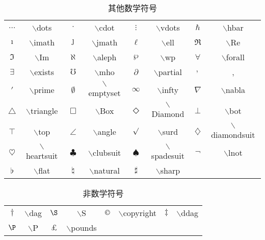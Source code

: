 \documentclass[UTF8]{ctexart}
\begin{document}
\begin{table}[H]
	\begin{center}
		\caption{其他数学符号}
		\begin{tabular}{cccccccc}
			
			
			$\dots$  &  $\backslash$dots  &  $\cdot$  & $\backslash$cdot  &  $\vdots$  & $\backslash$vdots  &  $\hbar$  &  $\backslash$hbar \\
			
			$\imath$ & $\backslash$imath &  $\jmath$  & $\backslash$jmath   &  $\ell$  & $\backslash$ell &  $\Re$ & $\backslash$Re \\
			
			
			$\Im$  &  $\backslash$Im  &  $\aleph$  & $\backslash$aleph  &  $\wp$  & $\backslash$wp  &  $\forall$  &  $\backslash$forall \\
			
			$\exists$ & $\backslash$exists &  $\mho$  & $\backslash$mho   &  $\partial$  & $\backslash$partial &  $,$ & , \\
			
			$\prime$ & $\backslash$prime &  $\emptyset$  & $\backslash$emptyset   &  $\infty$  & $\backslash$infty &  $\nabla$ & $\backslash$nabla \\	

			$\triangle$ & $\backslash$triangle &  $\Box$  & $\backslash$Box   &  $\Diamond$  & $\backslash$Diamond &  $\bot$ & $\backslash$bot \\	


			$\top$ & $\backslash$top &  $\angle$  & $\backslash$angle   &  $\surd$  & $\backslash$surd &  $\diamondsuit$ & $\backslash$diamondsuit \\	

			$\heartsuit$ & $\backslash$heartsuit &  $\clubsuit$  & $\backslash$clubsuit   &  $\spadesuit$  & $\backslash$spadesuit &  $\lnot$ & $\backslash$lnot \\	
			
			$\flat$ & $\backslash$flat &  $\natural$  & $\backslash$natural   &  $\sharp$  & $\backslash$sharp  \\				
		\end{tabular}
	\end{center}
\end{table}

\begin{table}[H]
	\begin{center}
		\caption{非数学符号}
		\begin{tabular}{cccccccc}
			
			
			$\dag$  &  $\backslash$dag  &  $\S$  & $\backslash$S  &  $\copyright$  & $\backslash$copyright  &  $\ddag$  &  $\backslash$ddag \\
			
			$\P$  &  $\backslash$P  &  $\pounds$  & $\backslash$pounds   \\
		\end{tabular}
	\end{center}
\end{table}
\end{document}
